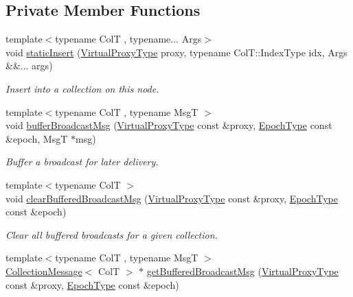 \subsection*{Private Member Functions}
\begin{DoxyCompactItemize}
\item 
{\footnotesize template$<$typename ColT , typename... Args$>$ }\\void \hyperlink{structvt_1_1vrt_1_1collection_1_1_collection_manager_a93eeb08585ad7a41c72e45ccd23be48c}{static\+Insert} (\hyperlink{namespacevt_a1b417dd5d684f045bb58a0ede70045ac}{Virtual\+Proxy\+Type} proxy, typename Col\+T\+::\+Index\+Type idx, Args \&\&... args)
\begin{DoxyCompactList}\small\item\em Insert into a collection on this node. \end{DoxyCompactList}\item 
{\footnotesize template$<$typename ColT , typename MsgT $>$ }\\void \hyperlink{structvt_1_1vrt_1_1collection_1_1_collection_manager_aba07682da41648437cacd485193063ec}{buffer\+Broadcast\+Msg} (\hyperlink{namespacevt_a1b417dd5d684f045bb58a0ede70045ac}{Virtual\+Proxy\+Type} const \&proxy, \hyperlink{namespacevt_a985a5adf291c34a3ca263b3378388236}{Epoch\+Type} const \&epoch, MsgT $\ast$msg)
\begin{DoxyCompactList}\small\item\em Buffer a broadcast for later delivery. \end{DoxyCompactList}\item 
{\footnotesize template$<$typename ColT $>$ }\\void \hyperlink{structvt_1_1vrt_1_1collection_1_1_collection_manager_a0366f1427431dcd6fedd41dee9a3fcce}{clear\+Buffered\+Broadcast\+Msg} (\hyperlink{namespacevt_a1b417dd5d684f045bb58a0ede70045ac}{Virtual\+Proxy\+Type} const \&proxy, \hyperlink{namespacevt_a985a5adf291c34a3ca263b3378388236}{Epoch\+Type} const \&epoch)
\begin{DoxyCompactList}\small\item\em Clear all buffered broadcasts for a given collection. \end{DoxyCompactList}\item 
{\footnotesize template$<$typename ColT , typename MsgT $>$ }\\\hyperlink{structvt_1_1vrt_1_1collection_1_1_collection_message}{Collection\+Message}$<$ ColT $>$ $\ast$ \hyperlink{structvt_1_1vrt_1_1collection_1_1_collection_manager_a8c992f2c417d5d44b8b8a603d21920de}{get\+Buffered\+Broadcast\+Msg} (\hyperlink{namespacevt_a1b417dd5d684f045bb58a0ede70045ac}{Virtual\+Proxy\+Type} const \&proxy, \hyperlink{namespacevt_a985a5adf291c34a3ca263b3378388236}{Epoch\+Type} const \&epoch)

\end{DoxyCompactItemize}
